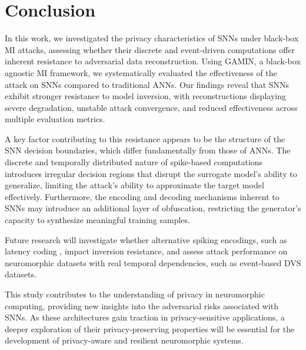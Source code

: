 \section{Conclusion}
\label{sec:conclusion}

\noindent
In this work, we investigated the privacy characteristics of SNNs under black-box MI attacks, assessing whether their discrete and event-driven computations offer inherent resistance to adversarial data reconstruction. Using GAMIN, a black-box agnostic MI framework, we systematically evaluated the effectiveness of the attack on SNNs compared to traditional ANNs. Our findings reveal that SNNs exhibit stronger resistance to model inversion, with reconstructions displaying severe degradation, unstable attack convergence, and reduced effectiveness across multiple evaluation metrics.

A key factor contributing to this resistance appears to be the structure of the SNN decision boundaries, which differ fundamentally from those of ANNs. The discrete and temporally distributed nature of spike-based computations introduces irregular decision regions that disrupt the surrogate model’s ability to generalize, limiting the attack’s ability to approximate the target model effectively. Furthermore, the encoding and decoding mechanisms inherent to SNNs may introduce an additional layer of obfuscation, restricting the generator’s capacity to synthesize meaningful training samples.

Future research will investigate whether alternative spiking encodings, such as latency coding \cite{auge2021survey}, impact inversion resistance, and assess attack performance on neuromorphic datasets with real temporal dependencies, such as event-based DVS datasets. 

This study contributes to the understanding of privacy in neuromorphic computing, providing new insights into the adversarial risks associated with SNNs. As these architectures gain traction in privacy-sensitive applications, a deeper exploration of their privacy-preserving properties will be essential for the development of privacy-aware and resilient neuromorphic systems.

